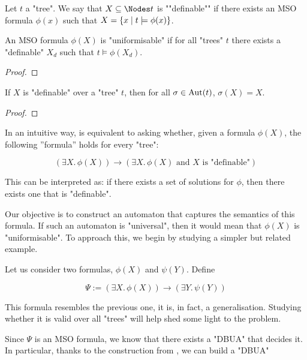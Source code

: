 \documentclass[a4paper,UKenglish,cleveref, autoref, thm-restate]{lipics-v2021}
\begin{document}
\begin{definition}\label{def:definable}
	Let $t$ a "tree". We say that $X \subseteq \Nodes t$ is ""definable"" if there exists an MSO formula $\phi(x)$ such that $ X = \left\{x \mid t \models \phi(x)\right\}$.
\end{definition}

\begin{lemma}
	An MSO formula $\phi(X)$ is "uniformisable" if for all "trees" $t$ there exists a "definable" $X_d$ such that $t \models \phi(X_d)$.
\end{lemma}

\begin{proof}
	\todo{~}
\end{proof}

\begin{lemma}\label{lem:def-aut}
	If $X$ is "definable" over a "tree" $t$, then for all $\sigma \in \text{Aut}(t)$, $\sigma(X) = X$.
\end{lemma}

\begin{proof}
	\todo{~}
\end{proof}


In an intuitive way,  is equivalent to asking whether,
given a formula $\phi(X)$, the following ''formula'' holds for every "tree":

\[
	(\exists X.\, \phi(X)) \rightarrow (\exists X.\, \phi(X) \text{ and $X$ is "definable"})
\]

This can be interpreted as: if there exists a set of solutions for $\phi$, then there exists one that is "definable".

Our objective is to construct an automaton that captures the semantics of this formula. If such an automaton is "universal",
then it would mean that $\phi(X)$ is "uniformisable". To approach this, we begin by studying a simpler but related example.

Let us consider two formulas, $\phi(X)$ and $\psi(Y)$. Define

\[
	\Psi := (\exists X.\, \phi(X)) \rightarrow (\exists Y.\, \psi(Y))
\]

This formula resembles the previous one, it is, in fact, a generalisation. Studying whether it is valid over all "trees" will
help shed some light to the problem.

Since $\Psi$ is an MSO formula, we know that there exists a "DBUA" that decides it. In particular, thanks to the
construction from , we can build a "DBUA"
\end{document}
